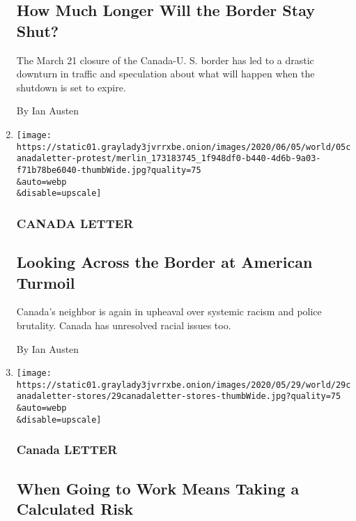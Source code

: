 \begin{enumerate}
  \hypertarget{how-much-longer-will-the-border-stay-shut}{%
  \subsection{How Much Longer Will the Border Stay
  Shut?}\label{how-much-longer-will-the-border-stay-shut}}

  The March 21 closure of the Canada-U. S. border has led to a drastic
  downturn in traffic and speculation about what will happen when the
  shutdown is set to expire.

  By Ian Austen
\item
  \href{/2020/06/05/world/canada/racism-canada.html}{}

  \texttt{[image: https://static01.graylady3jvrrxbe.onion/images/2020/06/05/world/05canadaletter-protest/merlin\_173183745\_1f948df0-b440-4d6b-9a03-f71b78be6040-thumbWide.jpg?quality=75\\\&auto=webp\\\&disable=upscale]}

  \hypertarget{canada-letter-6}{%
  \subsubsection{CANADA LETTER}\label{canada-letter-6}}

  \hypertarget{looking-across-the-border-at-american-turmoil}{%
  \subsection{Looking Across the Border at American
  Turmoil}\label{looking-across-the-border-at-american-turmoil}}

  Canada's neighbor is again in upheaval over systemic racism and police
  brutality. Canada has unresolved racial issues too.

  By Ian Austen
\item
  \href{/2020/05/29/world/canada/essential-workers.html}{}

  \texttt{[image: https://static01.graylady3jvrrxbe.onion/images/2020/05/29/world/29canadaletter-stores/29canadaletter-stores-thumbWide.jpg?quality=75\\\&auto=webp\\\&disable=upscale]}

  \hypertarget{canada-letter-7}{%
  \subsubsection{Canada LETTER}\label{canada-letter-7}}

  \hypertarget{when-going-to-work-means-taking-a-calculated-risk}{%
  \subsection{When Going to Work Means Taking a Calculated
  Risk}\label{when-going-to-work-means-taking-a-calculated-risk}}


\end{enumerate}
